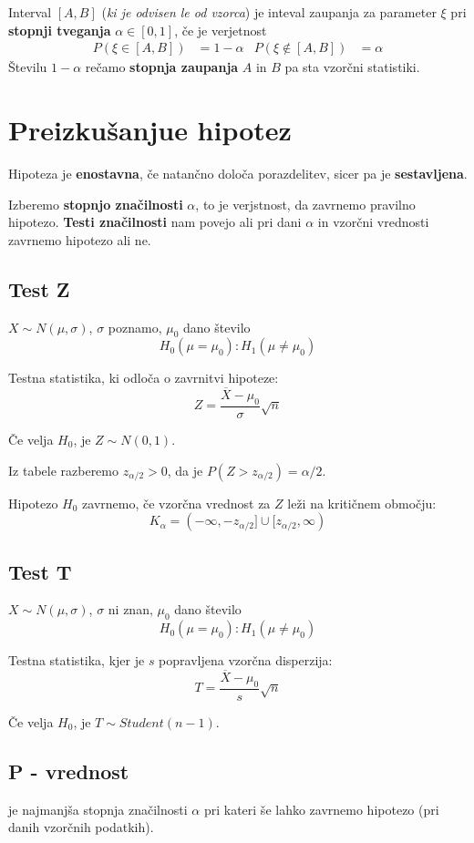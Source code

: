 \begin{multicols}{5}
Interval $[A, B]$ (\textit{ki je odvisen le od vzorca}) je inteval zaupanja za parameter $\xi$ pri \textbf{stopnji tveganja} $\alpha \in [0,1]$,
če je verjetnost
\begin{align*}
    P(\xi \in [A, B]) &= 1 - \alpha & P(\xi \notin [A, B]) &= \alpha
\end{align*}
Številu $1 - \alpha$ rečamo \textbf{stopnja zaupanja} $A$ in $B$ pa sta vzorčni statistiki.

\section{Preizkušanjue hipotez}
Hipoteza je \textbf{enostavna}, če natančno določa porazdelitev, sicer pa je \textbf{sestavljena}.

Izberemo \textbf{stopnjo značilnosti} $\alpha$, to je verjstnost, da zavrnemo pravilno hipotezo. \textbf{Testi značilnosti} nam
povejo ali pri dani $\alpha$ in vzorčni vrednosti zavrnemo hipotezo ali ne.

\subsection{Test Z}
$X \sim N(\mu, \sigma)$, $\sigma$ poznamo, $\mu_0$ dano število
\[ H_0(\mu = \mu_0) : H_1(\mu \neq \mu_0)\]

Testna statistika, ki odloča o zavrnitvi hipoteze:
\[ Z = \frac{\overline{X} - \mu_0}{\sigma} \sqrt{n}\]

Če velja $H_0$, je $Z \sim N(0,1)$.

Iz tabele razberemo $z_{\alpha/2} > 0$, da je $P(Z > z_{\alpha/2}) = \alpha/2$.

Hipotezo $H_0$ zavrnemo, če vzorčna vrednost za $Z$ leži na kritičnem območju:
\[ K_\alpha = (-\infty, -z_{\alpha/2}] \cup [z_{\alpha/2}, \infty)\]

\subsection{Test T}
$X \sim N(\mu, \sigma)$, $\sigma$ ni znan, $\mu_0$ dano število
\[ H_0(\mu = \mu_0) : H_1(\mu \neq \mu_0)\]

Testna statistika, kjer je $s$ popravljena vzorčna disperzija:
\[ T = \frac{\overline{X} - \mu_0}{s} \sqrt{n}\]

Če velja $H_0$, je $T \sim Student(n-1)$.

\subsection{P - vrednost}
je najmanjša stopnja značilnosti $\alpha$ pri kateri še lahko zavrnemo hipotezo (pri danih vzorčnih podatkih).


\end{multicols}
